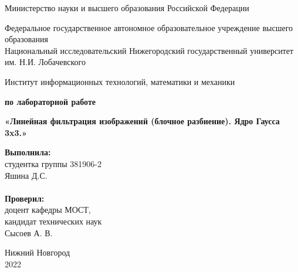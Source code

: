 \documentclass{report}
\begin{document}
\begin{titlepage}

\begin{center}
Министерство науки и высшего образования Российской Федерации
\end{center}

\begin{center}
Федеральное государственное автономное образовательное учреждение высшего образования \\
Национальный исследовательский Нижегородский государственный университет им. Н.И. Лобачевского
\end{center}

\begin{center}
Институт информационных технологий, математики и механики
\end{center}

\vspace{4em}

\begin{center}
\textbf{ по лабораторной работе} \\
\end{center}
\begin{center}
\textbf{\Large«Линейная фильтрация изображений (блочное разбиение). Ядро Гаусса 3x3.»} \\
\end{center}

\vspace{4em}

\newbox{\lbox}
\newlength{\maxl}
\setlength{\maxl}{\wd\lbox}
\hfill\parbox{7cm}{
\hspace*{5cm}\hspace*{-5cm}\textbf{Выполнила:} \\ студентка группы 381906-2 \\ Яшина Д.С. \\
\\
\hspace*{5cm}\hspace*{-5cm}\textbf{Проверил:}\\ доцент кафедры МОСТ, \\ кандидат технических наук \\ Сысоев А. В.\\
}
\vspace{\fill}

\begin{center} Нижний Новгород \\ 2022 \end{center}

\end{titlepage}
\end{document}
